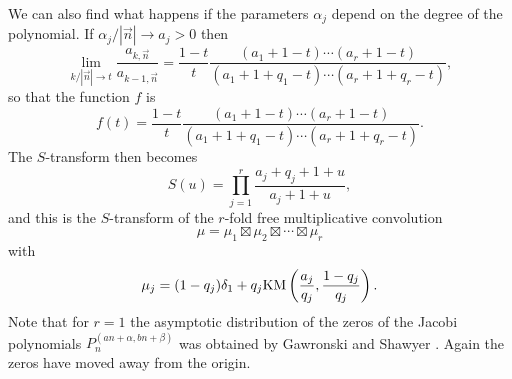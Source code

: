 \documentclass[12pt]{article}
\numberwithin{equation}{section}
\begin{document}
We can also find what happens if the parameters $\alpha_j$ depend on the degree of the polynomial.     
If $\alpha_j/|\vec{n}| \to a_j >0$ then
\[   \lim_{k/|\vec{n}| \to t}  \frac{a_{k,\vec{n}}}{a_{k-1,\vec{n}}} = \frac{1-t}{t} \frac{(a_1+1-t)\cdots(a_r+1-t)}{(a_1+1+q_1-t)\cdots(a_r+1+q_r-t)}, \]
so that the function $f$ is
\[   f(t) = \frac{1-t}{t} \frac{(a_1+1-t)\cdots(a_r+1-t)}{(a_1+1+q_1-t)\cdots(a_r+1+q_r-t)}.  \]
The $S$-transform then becomes
\[   S(u) = \prod_{j=1}^r \frac{a_j+q_j+1+u}{a_j+1+u}, \]
and this is the $S$-transform of the $r$-fold free multiplicative convolution
\[     \mu =  \mu_1 \boxtimes \mu_2 \boxtimes \cdots \boxtimes \mu_r  \]
with
\[     \mu_j = (1-q_j) \delta_1 + q_j \textup{KM}\left( \frac{a_j}{q_j}, \frac{1-q_j}{q_j} \right).   \]
Note that for $r=1$ the asymptotic distribution of the zeros of the Jacobi polynomials $P_n^{(an+\alpha,bn+\beta)}$ was obtained by Gawronski and Shawyer 
\cite{Gawronski-Shawyer}. Again the zeros have moved away from the origin.
\end{document}
